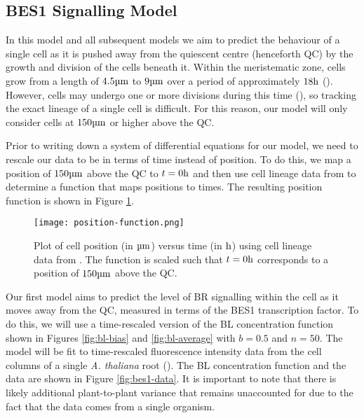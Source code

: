 \subsection{BES1 Signalling Model} \label{bes1-model-section}

In this model and all subsequent models we aim to predict the behaviour of a single cell as it is pushed away from the quiescent centre (henceforth QC) by the growth and division of the cells beneath it. Within the meristematic zone, cells grow from a length of $4.5\um$ to $9\um$ over a period of approximately $18\h$ (\cite{verbelen2006}). However, cells may undergo one or more divisions during this time (\cite{goh2023}), so tracking the exact lineage of a single cell is difficult. For this reason, our model will only consider cells at $150\um$ or higher above the QC. 

\medskip

Prior to writing down a system of differential equations for our model, we need to rescale our data to be in terms of time instead of position. To do this, we map a position of $150\um$ above the QC to $t = 0\h$ and then use cell lineage data from \cite{goh2023} to determine a function that maps positions to times. The resulting position function is shown in Figure \ref{fig:position-function}.

\begin{figure}[!htb]
    \centering
    \texttt{[image: position-function.png]}
    \caption{Plot of cell position (in $\um$) versus time (in $\h$) using cell lineage data from \cite{goh2023}. The function is scaled such that $t = 0\h$ corresponds to a position of $150\um$ above the QC.}
    \label{fig:position-function}
\end{figure}

\medskip

Our first model aims to predict the level of BR signalling within the cell as it moves away from the QC, measured in terms of the BES1 transcription factor. To do this, we will use a time-rescaled version of the BL concentration function shown in Figures \ref{fig:bl-bias} and \ref{fig:bl-average} with $b = 0.5$ and $n = 50$. The model will be fit to time-rescaled fluorescence intensity data from the cell columns of a single \emph{A. thaliana} root (\cite{vukasinovic2021}). The BL concentration function and the data are shown in Figure \ref{fig:bes1-data}. It is important to note that there is likely additional plant-to-plant variance that remains unaccounted for due to the fact that the data comes from a single organism. 

